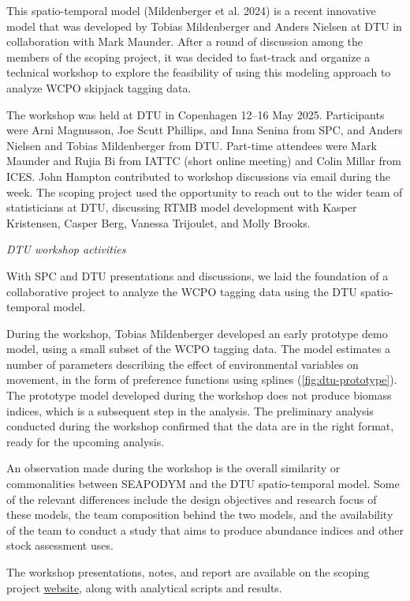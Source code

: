 \documentclass{SCreport}
\newcommand\tree
{https://github.com/PacificCommunity/ofp-sam-transition-plan/tree/main}
\begin{document}
This spatio-temporal model (Mildenberger et al. 2024) is a recent innovative
model that was developed by Tobias Mildenberger and Anders Nielsen at DTU in
collaboration with Mark Maunder. After a round of discussion among the members
of the scoping project, it was decided to fast-track and organize a technical
workshop to explore the feasibility of using this modeling approach to analyze
WCPO skipjack tagging data.

The workshop was held at DTU in Copenhagen 12--16 May 2025. Participants were
Arni Magnusson, Joe Scutt Phillips, and Inna Senina from SPC, and Anders Nielsen
and Tobias Mildenberger from DTU. Part-time attendees were Mark Maunder and
Rujia Bi from IATTC (short online meeting) and Colin Millar from ICES. John
Hampton contributed to workshop discussions via email during the week. The
scoping project used the opportunity to reach out to the wider team of
statisticians at DTU, discussing RTMB model development with Kasper Kristensen,
Casper Berg, Vanessa Trijoulet, and Molly Brooks.

\vspace{2ex}

\textit{DTU workshop activities}

With SPC and DTU presentations and discussions, we laid the foundation of a
collaborative project to analyze the WCPO tagging data using the DTU
spatio-temporal model.

During the workshop, Tobias Mildenberger developed an early prototype demo
model, using a small subset of the WCPO tagging data. The model estimates a
number of parameters describing the effect of environmental variables on
movement, in the form of preference functions using splines
(\autoref{fig:dtu-prototype}). The prototype model developed during the workshop
does not produce biomass indices, which is a subsequent step in the analysis.
The preliminary analysis conducted during the workshop confirmed that the data
are in the right format, ready for the upcoming analysis.

An observation made during the workshop is the overall similarity or
commonalities between SEAPODYM and the DTU spatio-temporal model. Some of the
relevant differences include the design objectives and research focus of these
models, the team composition behind the two models, and the availability of the
team to conduct a study that aims to produce abundance indices and other stock
assessment uses.

The workshop presentations, notes, and report are available on the scoping
project \href{\tree/workshops/2025-05-copenhagen}{website}, along with
analytical scripts and results.
\end{document}
